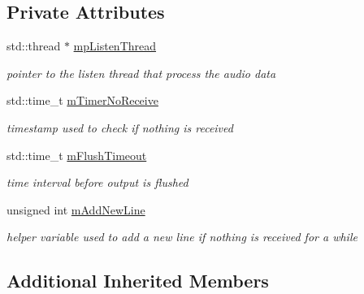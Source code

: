 \subsection*{Private Attributes}
\begin{DoxyCompactItemize}
\item 
\mbox{\label{classMainDialog_af4537bbf090137035880a13f50cb9789}} 
std\+::thread $\ast$ \hyperlink{classMainDialog_af4537bbf090137035880a13f50cb9789}{mp\+Listen\+Thread}
\begin{DoxyCompactList}\small\item\em pointer to the listen thread that process the audio data \end{DoxyCompactList}\item 
\mbox{\label{classMainDialog_ae61ec8f7594554de53ccbf6fea4e7493}} 
std\+::time\+\_\+t \hyperlink{classMainDialog_ae61ec8f7594554de53ccbf6fea4e7493}{m\+Timer\+No\+Receive}
\begin{DoxyCompactList}\small\item\em timestamp used to check if nothing is received \end{DoxyCompactList}\item 
\mbox{\label{classMainDialog_a12e6e6ff1f1d3532b607d0ada1e3698d}} 
std\+::time\+\_\+t \hyperlink{classMainDialog_a12e6e6ff1f1d3532b607d0ada1e3698d}{m\+Flush\+Timeout}
\begin{DoxyCompactList}\small\item\em time interval before output is flushed \end{DoxyCompactList}\item 
\mbox{\label{classMainDialog_a9abeb88ddd08e9f442ff3be153a8e6c4}} 
unsigned int \hyperlink{classMainDialog_a9abeb88ddd08e9f442ff3be153a8e6c4}{m\+Add\+New\+Line}
\begin{DoxyCompactList}\small\item\em helper variable used to add a new line if nothing is received for a while \end{DoxyCompactList}\end{DoxyCompactItemize}
\subsection*{Additional Inherited Members}


